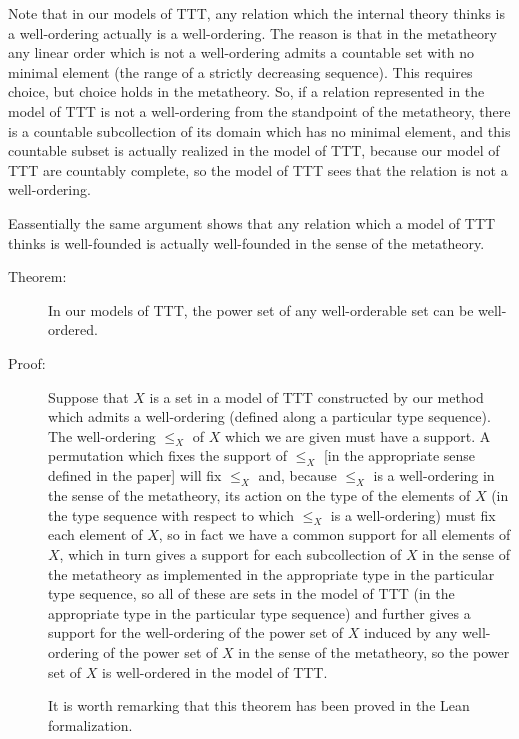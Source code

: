 \documentclass{article}
\theoremstyle{definition}
\theoremstyle{remark}
\begin{document}
Note that in our models of TTT, any relation which the internal theory thinks is a well-ordering actually is a well-ordering.
The reason is that in the metatheory any linear order which is not a well-ordering admits a countable set with no minimal element (the range of a strictly decreasing sequence).  This requires choice, but choice holds in the metatheory.  So, if a relation represented in the model of TTT is not a well-ordering from the standpoint of the metatheory, there is a countable subcollection of its domain which has no minimal element, and this countable subset is actually realized in the model of TTT, because our model of TTT are countably complete, so the model of TTT sees that the relation is not a well-ordering.

Eassentially the same argument shows that any relation which a model of TTT thinks is well-founded is actually well-founded in the sense of the metatheory.

\begin{description}

\item[Theorem:]  In our models of TTT, the power set of any well-orderable set can be well-ordered.

\item[Proof:]  Suppose that $X$ is a set in a model of TTT constructed by our method which admits a well-ordering (defined along a particular type sequence).
The well-ordering $\leq_X$ of $X$ which we are given must have a support.  A permutation which fixes the support of $\leq_X$ [in the appropriate sense defined in the paper] will fix $\leq_X$ and, because $\leq_X$ is a well-ordering in the sense of the metatheory, its action on the type of the elements of $X$ (in the type sequence with respect to which $\leq_X$ is a well-ordering) must fix each element of $X$,
so in fact we have a common support for all elements of $X$, which in turn gives a support for each subcollection of $X$ in the sense of the metatheory as implemented in the appropriate type in the particular type sequence, so all of these are sets in the model of TTT (in the appropriate type in the particular type sequence) and further gives a support for the well-ordering of the power set of $X$ induced by any well-ordering of the power set of $X$ in the sense of the metatheory, so the power set of $X$ is well-ordered in the model of TTT.

It is worth remarking that this theorem has been proved in the Lean formalization.



\end{description}
\end{document}
